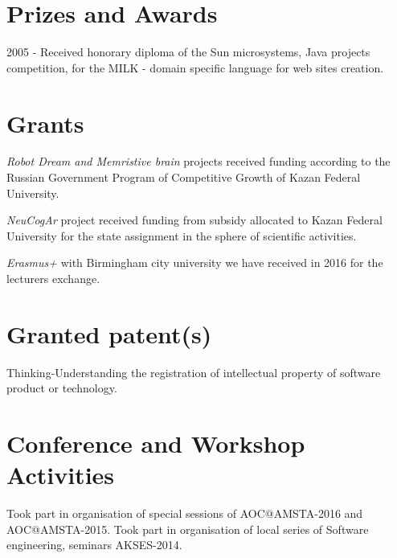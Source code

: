 \documentclass{moderncv}
\begin{document}
\section{Prizes and Awards}

2005 - Received honorary diploma of the Sun microsystems, Java projects competition, for the MILK - domain specific language for web sites creation.

\section{Grants}

\emph{Robot Dream and Memristive brain} projects received funding according to the Russian Government Program of Competitive Growth of Kazan Federal University.

\emph{NeuCogAr} project received funding from subsidy allocated to Kazan Federal University for the state assignment in the sphere of scientific activities.

\emph{Erasmus+} with Birmingham city university we have received in 2016 for the lecturers exchange. 

\section{Granted patent(s)}

Thinking-Understanding the registration of intellectual property of software product or technology.

\printbibliography[title={Most popular papers}, category = crucial]
 
\nocite{*}
\printbibliography[title={Papers}]

\cvitem{}{}

\section{Conference and Workshop Activities}


Took part in organisation of special sessions of AOC@AMSTA-2016 and AOC@AMSTA-2015. Took part in organisation of local series of Software engineering, seminars AKSES-2014.
\end{document}
